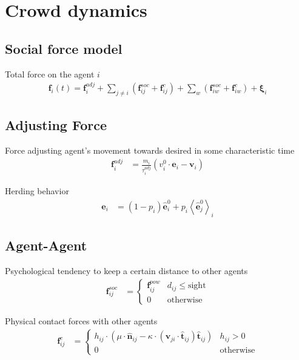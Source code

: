 \section{Crowd dynamics}
\subsection{Social force model}
Total force on the agent $ i $
\begin{align}
\mathbf{f}_{i}(t) = \mathbf{f}_{i}^{adj} + \sum_{j\neq i}^{} \left(\mathbf{f}_{ij}^{soc} + \mathbf{f}_{ij}^{c}\right) + \sum_{w}^{} \left(\mathbf{f}_{iw}^{soc} + \mathbf{f}_{iw}^{c}\right) + \boldsymbol{\xi}_{i}
\end{align}


\subsection{Adjusting Force}
Force adjusting agent's movement towards desired in some characteristic time \begin{align}
\mathbf{f}_{i}^{adj} &= \frac{m_{i}}{\tau_{i}^{adj}} (v_{i}^{0} \cdot \hat{\mathbf{e}}_{i} - \mathbf{v}_{i}) 
\end{align}

Herding behavior
\begin{align}
\mathbf{e}_{i} &= (1 - p_{i}) \hat{\mathbf{e}}_{i}^{0} + p_{i} \left\langle \hat{\mathbf{e}}_{j}^{0} \right\rangle_{i}
\end{align}


\subsection{Agent-Agent}
Psychological tendency to keep a certain distance to other agents
\begin{align}
\mathbf{f}_{ij}^{soc} &=
\begin{cases}
\mathbf{f}_{ij}^{pow} &  d_{ij} \leq \text{sight} \\
0 & \text{otherwise}
\end{cases}
\end{align}

Physical contact forces with other agents 
\begin{align}
\mathbf{f}_{ij}^{c} &= 
\begin{cases}
h_{ij} \cdot \left(\mu \cdot \hat{\mathbf{n}}_{ij} - \kappa \cdot \left(\mathbf{v}_{ji} \cdot \hat{\mathbf{t}}_{ij}\right) \hat{\mathbf{t}}_{ij}\right) & h_{ij} > 0 \\
0 & \text{otherwise}
\end{cases}
\end{align}


